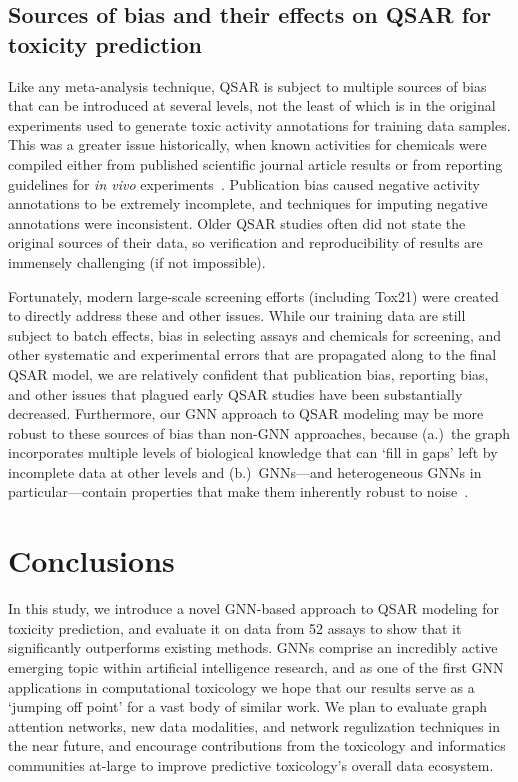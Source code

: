 \documentclass{ws-procs11x85}
\begin{document}
\subsection{Sources of bias and their effects on QSAR for toxicity prediction}
Like any meta-analysis technique, QSAR is subject to multiple sources of bias that can be introduced at several levels, not the least of which is in the original experiments used to generate toxic activity annotations for training data samples.
This was a greater issue historically, when known activities for chemicals were compiled either from published scientific journal article results or from reporting guidelines for \textit{in vivo} experiments~\cite{cronin2019identification}.
Publication bias caused negative activity annotations to be extremely incomplete, and techniques for imputing negative annotations were inconsistent.
Older QSAR studies often did not state the original sources of their data, so verification and reproducibility of results are immensely challenging (if not impossible).

Fortunately, modern large-scale screening efforts (including Tox21) were created to directly address these and other issues.
While our training data are still subject to batch effects, bias in selecting assays and chemicals for screening, and other systematic and experimental errors that are propagated along to the final QSAR model, we are relatively confident that publication bias, reporting bias, and other issues that plagued early QSAR studies have been substantially decreased. Furthermore, our GNN approach to QSAR modeling may be more robust to these sources of bias than non-GNN approaches, because (a.)~the graph incorporates multiple levels of biological knowledge that can `fill in gaps' left by incomplete data at other levels and (b.)~GNNs---and heterogeneous GNNs in particular---contain properties that make them inherently robust to noise~\cite{xie2020heterogeneous,nt2019revisiting}.
\section{Conclusions}
In this study, we introduce a novel GNN-based approach to QSAR modeling for toxicity prediction, and evaluate it on data from 52 assays to show that it significantly outperforms existing methods.
GNNs comprise an incredibly active emerging topic within artificial intelligence research, and as one of the first GNN applications in computational toxicology we hope that our results serve as a `jumping off point' for a vast body of similar work.
We plan to evaluate graph attention networks, new data modalities, and network regulization techniques in the near future, and encourage contributions from the toxicology and informatics communities at-large to improve predictive toxicology's overall data ecosystem.
\end{document}
